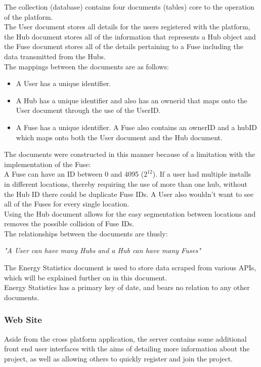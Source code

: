 \documentclass[preprint,12pt,3p]{elsarticle}
\begin{document}
The collection (database) contains four documents (tables) core to the operation of the platform.\\
The User document stores all details for the users registered with the platform, the Hub document stores all of the information that represents a Hub object and the Fuse document stores all of the details pertaining to a Fuse including the data transmitted from the Hubs.\\
The mappings between the documents are as follows:
\begin{itemize}
\item A User has a unique identifier.
\item A Hub has a unique identifier and also has an ownerid that maps onto the User document through the use of the UserID.
\item A Fuse has a unique identifier. A Fuse also contains an ownerID and a hubID which maps onto both the User document and the Hub document.
\end{itemize}
The documents were constructed in this manner because of a limitation with the implementation of the Fuse:\\
A Fuse can have an ID between 0 and 4095 ($2^{12}$). If a user had multiple installs in different locations, thereby requiring the use of more than one hub, without the Hub ID there could be duplicate Fuse IDs. A User also wouldn't want to see all of the Fuses for every single location.\\ 
Using the Hub document allows for the easy segmentation between locations and removes the possible collision of Fuse IDs.\\

The relationships between the documents are thusly:
\begin{center}
    \textit{"A User can have many Hubs and a Hub can have many Fuses"}
\end{center}
The Energy Statistics document is used to store data scraped from various APIs, which will be explained further on in this document.\\
Energy Statistics has a primary key of date, and bears no relation to any other documents. 

\subsubsection{Web Site}
Aside from the cross platform application, the server contains some additional front end user interfaces with the aims of detailing more information about the project, as well as allowing others to quickly register and join the project.\\
\end{document}
